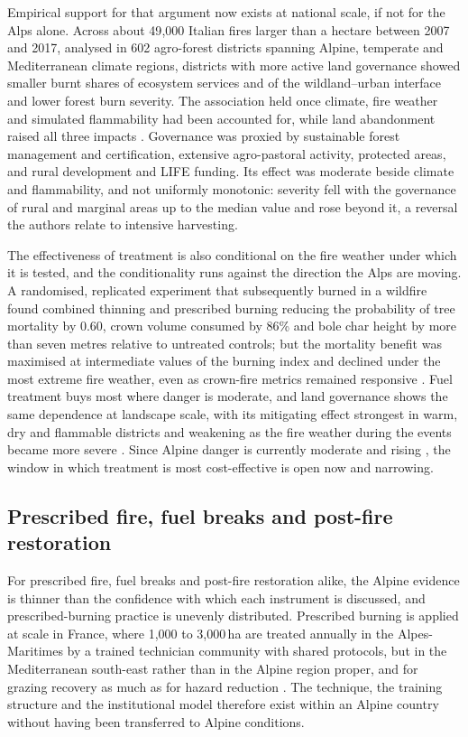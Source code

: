 \documentclass[11pt,a4paper]{article}
\begin{document}
Empirical support for that argument now exists at national scale, if not for the Alps alone. Across about 49{,}000 Italian fires larger than a hectare between 2007 and 2017, analysed in 602 agro-forest districts spanning Alpine, temperate and Mediterranean climate regions, districts with more active land governance showed smaller burnt shares of ecosystem services and of the wildland--urban interface and lower forest burn severity. The association held once climate, fire weather and simulated flammability had been accounted for, while land abandonment raised all three impacts \citep{spadoni_active_2023}. Governance was proxied by sustainable forest management and certification, extensive agro-pastoral activity, protected areas, and rural development and LIFE funding. Its effect was moderate beside climate and flammability, and not uniformly monotonic: severity fell with the governance of rural and marginal areas up to the median value and rose beyond it, a reversal the authors relate to intensive harvesting.

The effectiveness of treatment is also conditional on the fire weather under which it is tested, and the conditionality runs against the direction the Alps are moving. A randomised, replicated experiment that subsequently burned in a wildfire found combined thinning and prescribed burning reducing the probability of tree mortality by 0.60, crown volume consumed by 86\% and bole char height by more than seven metres relative to untreated controls; but the mortality benefit was maximised at intermediate values of the burning index and declined under the most extreme fire weather, even as crown-fire metrics remained responsive \citep{brodie_forest_2024}. Fuel treatment buys most where danger is moderate, and land governance shows the same dependence at landscape scale, with its mitigating effect strongest in warm, dry and flammable districts and weakening as the fire weather during the events became more severe \citep{spadoni_active_2023}. Since Alpine danger is currently moderate and rising \citep{gerberding_mapping_2025, miller_climate_2024}, the window in which treatment is most cost-effective is open now and narrowing.

\subsection{Prescribed fire, fuel breaks and post-fire restoration}
\label{sec:fuelbreaks}

For prescribed fire, fuel breaks and post-fire restoration alike, the Alpine evidence is thinner than the confidence with which each instrument is discussed, and prescribed-burning practice is unevenly distributed. Prescribed burning is applied at scale in France, where 1{,}000 to 3{,}000\,ha are treated annually in the Alpes-Maritimes by a trained technician community with shared protocols, but in the Mediterranean south-east rather than in the Alpine region proper, and for grazing recovery as much as for hazard reduction \citep{muller_forest_2020}. The technique, the training structure and the institutional model therefore exist within an Alpine country without having been transferred to Alpine conditions.
\end{document}
